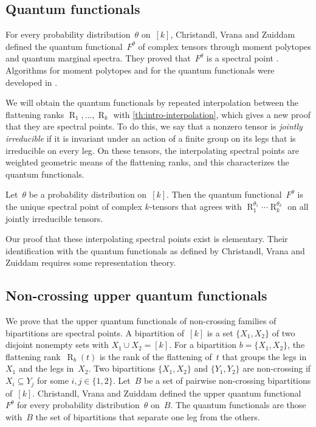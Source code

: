 \documentclass[11pt,letterpaper]{article}
\DeclareMathOperator{\tensorrank}{R}
\begin{document}
\subsection{Quantum functionals}

For every probability distribution~\(\theta\) on~\([k]\), Christandl, Vrana and Zuiddam \cite{MR4495838} defined the quantum functional~\(F^\theta\) of complex tensors through moment polytopes and quantum marginal spectra. They proved that~\(F^\theta\) is a spectral point \cite[Corollary~3.31]{MR4495838}. Algorithms for moment polytopes and for the quantum functionals were developed in \cite{MR3899650,MR4228202,MR4849336,MR4928469,doğan2026convexoptimizationmomentpolytopes}. 

We will obtain the quantum functionals by repeated interpolation between the flattening ranks \(\tensorrank_1,\ldots,\tensorrank_k\) with \cref{th:intro-interpolation}, which gives a new proof that they are spectral points. To do this, we say that a nonzero tensor is \emph{jointly irreducible} if it is invariant under an action of a finite group on its legs that is irreducible on every leg. On these tensors, the interpolating spectral points are weighted geometric means of the flattening ranks, and this characterizes the quantum functionals.

\begin{theorem}\label{th:intro-qf}
Let~\(\theta\) be a probability distribution on~\([k]\). Then the quantum functional~\(F^\theta\) is the unique spectral point of complex \(k\)-tensors that agrees with \(\tensorrank_1^{\theta_1}\cdots\tensorrank_k^{\theta_k}\) on all jointly irreducible tensors.
\end{theorem}

Our proof that these interpolating spectral points exist is elementary. Their identification with the quantum functionals as defined by Christandl, Vrana and Zuiddam \cite{MR4495838} requires some representation theory.

\subsection{Non-crossing upper quantum functionals}

We prove that the upper quantum functionals of non-crossing families of bipartitions are spectral points. A bipartition of~\([k]\) is a set \(\{X_1,X_2\}\) of two disjoint nonempty sets with \(X_1\cup X_2=[k]\). For a bipartition \(b=\{X_1,X_2\}\), the flattening rank~\(\tensorrank_b(t)\) is the rank of the flattening of~\(t\) that groups the legs in~\(X_1\) and the legs in~\(X_2\). Two bipartitions \(\{X_1,X_2\}\) and \(\{Y_1,Y_2\}\) are non-crossing if \(X_i\subseteq Y_j\) for some \(i,j\in\{1,2\}\). Let~\(B\) be a set of pairwise non-crossing bipartitions of~\([k]\). Christandl, Vrana and Zuiddam \cite[Definition~3.14]{MR4495838} defined the upper quantum functional~\(F^\theta\) for every probability distribution~\(\theta\) on~\(B\). The quantum functionals are those with~\(B\) the set of bipartitions that separate one leg from the others.
\end{document}
